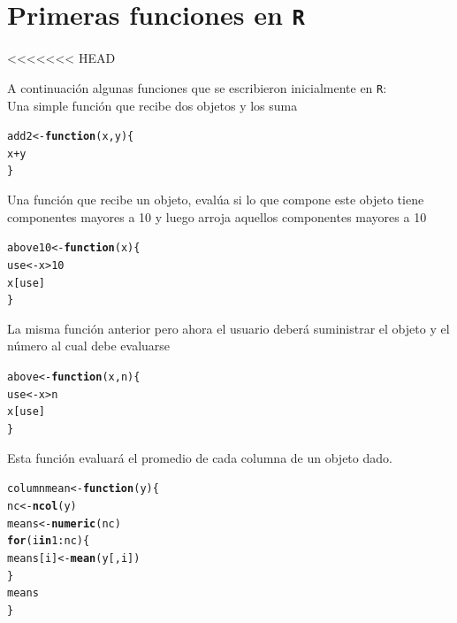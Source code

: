 \documentclass{article}\usepackage[]{graphicx}\usepackage[]{color}
\makeatletter
\newcommand{\hlnum}[1]{\textcolor[rgb]{0.686,0.059,0.569}{#1}}%
\newcommand{\hlopt}[1]{\textcolor[rgb]{0,0,0}{#1}}%
\newcommand{\hlstd}[1]{\textcolor[rgb]{0.345,0.345,0.345}{#1}}%
\newcommand{\hlkwa}[1]{\textcolor[rgb]{0.161,0.373,0.58}{\textbf{#1}}}%
\newcommand{\hlkwb}[1]{\textcolor[rgb]{0.69,0.353,0.396}{#1}}%
\newcommand{\hlkwc}[1]{\textcolor[rgb]{0.333,0.667,0.333}{#1}}%
\newcommand{\hlkwd}[1]{\textcolor[rgb]{0.737,0.353,0.396}{\textbf{#1}}}%
\newenvironment{kframe}{%
 \def\at@end@of@kframe{}%
 \ifinner\ifhmode%
  \def\at@end@of@kframe{\end{minipage}}%
  \begin{minipage}{\columnwidth}%
 \fi\fi%
 \def\FrameCommand##1{\hskip\@totalleftmargin \hskip-\fboxsep
 \colorbox{shadecolor}{##1}\hskip-\fboxsep
     \hskip-\linewidth \hskip-\@totalleftmargin \hskip\columnwidth}%
 \MakeFramed {\advance\hsize-\width
   \@totalleftmargin\z@ \linewidth\hsize
   \@setminipage}}%
 {\par\unskip\endMakeFramed%
 \at@end@of@kframe}
\newenvironment{knitrout}{}{} %
\makeatother
\begin{document}
\section{Primeras funciones en \texttt{R}}
<<<<<<< HEAD

A continuación algunas funciones que se escribieron inicialmente en \texttt{R}:\\

Una simple función que recibe dos objetos y los suma
\begin{knitrout}
\color{fgcolor}\begin{kframe}
\begin{alltt}
\hlstd{add2} \hlkwb{<-} \hlkwa{function}\hlstd{(}\hlkwc{x}\hlstd{,} \hlkwc{y}\hlstd{) \{}
    \hlstd{x} \hlopt{+} \hlstd{y}
\hlstd{\}}
\end{alltt}
\end{kframe}
\end{knitrout}

Una función que recibe un objeto, evalúa si lo que compone este objeto tiene componentes mayores a 10 y luego arroja aquellos componentes mayores a 10   
\begin{knitrout}
\color{fgcolor}\begin{kframe}
\begin{alltt}
\hlstd{above10} \hlkwb{<-} \hlkwa{function}\hlstd{(}\hlkwc{x}\hlstd{)\{}
      \hlstd{use} \hlkwb{<-} \hlstd{x} \hlopt{>} \hlnum{10}
      \hlstd{x[use]}
\hlstd{\}}
\end{alltt}
\end{kframe}
\end{knitrout}

La misma función anterior pero ahora el usuario deberá suministrar el objeto y el número al cual debe evaluarse
\begin{knitrout}
\color{fgcolor}\begin{kframe}
\begin{alltt}
\hlstd{above} \hlkwb{<-} \hlkwa{function}\hlstd{(}\hlkwc{x}\hlstd{,} \hlkwc{n}\hlstd{)\{}
  \hlstd{use} \hlkwb{<-} \hlstd{x} \hlopt{>} \hlstd{n}
  \hlstd{x[use]}
\hlstd{\}}
\end{alltt}
\end{kframe}
\end{knitrout}

Esta función evaluará el promedio de cada columna de un objeto dado.
\begin{knitrout}
\color{fgcolor}\begin{kframe}
\begin{alltt}
\hlstd{columnmean} \hlkwb{<-} \hlkwa{function}\hlstd{(}\hlkwc{y}\hlstd{) \{}
  \hlstd{nc} \hlkwb{<-} \hlkwd{ncol}\hlstd{(y)}
  \hlstd{means} \hlkwb{<-} \hlkwd{numeric}\hlstd{(nc)}
    \hlkwa{for}\hlstd{(i} \hlkwa{in} \hlnum{1}\hlopt{:}\hlstd{nc) \{}
      \hlstd{means[i]} \hlkwb{<-} \hlkwd{mean}\hlstd{(y[, i])}
    \hlstd{\}}
  \hlstd{means}
\hlstd{\}}
\end{alltt}
\end{kframe}
\end{knitrout}
\end{document}
